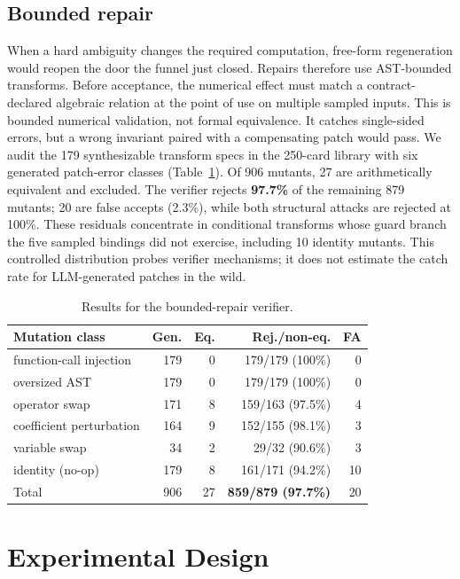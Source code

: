 \documentclass[sigconf,anonymous]{acmart}
\begin{document}
\subsection{Bounded repair}
When a hard ambiguity changes the required computation, free-form regeneration would reopen the door the funnel just closed.
Repairs therefore use AST-bounded transforms. Before acceptance, the numerical effect must match a contract-declared algebraic relation at the point of use on multiple sampled inputs.
This is bounded numerical validation, not formal equivalence. It catches single-sided errors, but a wrong invariant paired with a compensating patch would pass.
We audit the 179 synthesizable transform specs in the 250-card library with six generated patch-error classes (Table~\ref{tab:repairbench}). Of 906 mutants, 27 are arithmetically equivalent and excluded. The verifier rejects \textbf{97.7\%} of the remaining 879 mutants; 20 are false accepts (2.3\%), while both structural attacks are rejected at 100\%. These residuals concentrate in conditional transforms whose guard branch the five sampled bindings did not exercise, including 10 identity mutants. This controlled distribution probes verifier mechanisms; it does not estimate the catch rate for LLM-generated patches in the wild.

\begin{table}[t]
\caption{Results for the bounded-repair verifier.}
\label{tab:repairbench}
\centering
\begin{tabular}{@{}lrrrr@{}}
\toprule
Mutation class & Gen. & Eq. & Rej./non-eq. & FA \\
\midrule
function-call injection & 179 & 0 & 179/179 (100\%) & 0 \\
oversized AST & 179 & 0 & 179/179 (100\%) & 0 \\
operator swap & 171 & 8 & 159/163 (97.5\%) & 4 \\
coefficient perturbation & 164 & 9 & 152/155 (98.1\%) & 3 \\
variable swap & 34 & 2 & 29/32 (90.6\%) & 3 \\
identity (no-op) & 179 & 8 & 161/171 (94.2\%) & 10 \\
\midrule
Total & 906 & 27 & \textbf{859/879 (97.7\%)} & 20 \\
\bottomrule
\end{tabular}
\end{table}

\section{Experimental Design}\label{sec:v2design}
\end{document}

